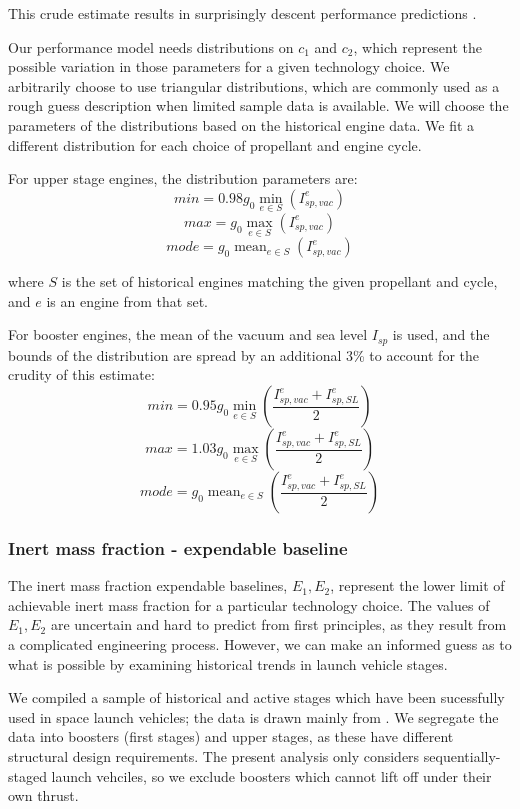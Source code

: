 \documentclass[conf]{../new-aiaa}
\DeclareMathOperator*{\mean}{mean}
\begin{document}
This crude estimate results in surprisingly descent performance predictions \cite{Alber2012}. 

Our performance model needs distributions on $c_1$ and $c_2$, which represent the possible variation in those parameters for a given technology choice. We arbitrarily choose to use triangular distributions, which are commonly used as a rough guess description when limited sample data is available. We will choose the parameters of the distributions based on the historical engine data. We fit a different distribution for each choice of propellant and engine cycle.

For upper stage engines, the distribution parameters are:
\[
 min = 0.98 g_0 \min_{e \in S}(I_{sp, vac}^{e})
\]
\[
 max = g_0 \max_{e \in S}(I_{sp, vac}^{e})
\]
\[
 mode = g_0 \mean_{e \in S}(I_{sp, vac}^{e})
\]

where $S$ is the set of historical engines matching the given propellant and cycle, and $e$ is an engine from that set.

For booster engines, the mean of the vacuum and sea level $I_{sp}$ is used, and the bounds of the distribution are spread by an additional 3\% to account for the crudity of this estimate:
\[
 min = 0.95 g_0 \min_{e \in S}\left( \frac{I_{sp, vac}^e + I_{sp, SL}^e}{2} \right)
\]
\[
 max = 1.03 g_0 \max_{e \in S}\left( \frac{I_{sp, vac}^e + I_{sp, SL}^e}{2} \right)
\]
\[
 mode = g_0 \mean_{e \in S}\left( \frac{I_{sp, vac}^e + I_{sp, SL}^e}{2} \right)
\]

\subsubsection{Inert mass fraction - expendable baseline}
The inert mass fraction expendable baselines, $E_1, E_2$, represent the lower limit of achievable inert mass fraction for a particular technology choice.
The values of $E_1, E_2$ are uncertain and hard to predict from first principles, as they result from a complicated engineering process. However, we can make an informed guess as to what is possible by examining historical trends in launch vehicle stages.

We compiled a sample of historical and active stages which have been sucessfully used in space launch vehicles; the data is drawn mainly from \cite{Isakowitz2004}. We segregate the data into boosters (first stages) and upper stages, as these have different structural design requirements. The present analysis only considers sequentially-staged launch vehciles, so we exclude boosters which cannot lift off under their own thrust.
\end{document}
